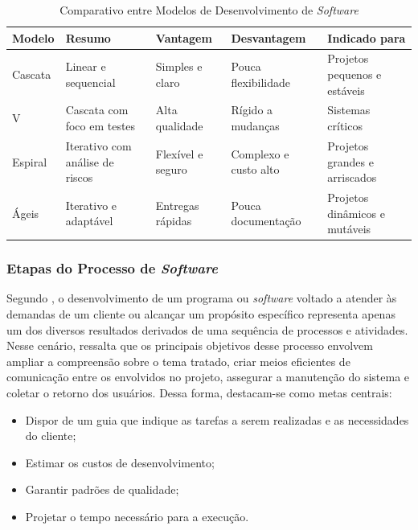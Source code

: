 \documentclass[english,brazilian]{UNISINOSartigo} %
\begin{document}
\begin{table}[ht]
    \caption{Comparativo entre Modelos de Desenvolvimento de \textit{Software}}
    \label{tab:modelosDev}
    \centering%
    \footnotesize
    \begin{tabularx}{\textwidth}{lXXXX}
        \toprule
        \textbf{Modelo} & \textbf{Resumo} & \textbf{Vantagem} & \textbf{Desvantagem} & \textbf{Indicado para}\\
        \midrule
        Cascata & Linear e sequencial & Simples e claro & Pouca flexibilidade & Projetos pequenos e estáveis \\
        \midrule
        V & Cascata com foco em testes & Alta qualidade & Rígido a mudanças & Sistemas críticos \\
        \midrule
        Espiral & Iterativo com análise de riscos & Flexível e seguro & Complexo e custo alto & Projetos grandes e arriscados \\
        \midrule
        Ágeis & Iterativo e adaptável & Entregas rápidas & Pouca documentação & Projetos dinâmicos e mutáveis \\
        \bottomrule
    \end{tabularx}
\end{table}
\FloatBarrier

\subsubsection{Etapas do Processo de \textit{Software}}

Segundo , o desenvolvimento de um programa ou \textit{software} voltado a atender às demandas de um cliente ou alcançar um propósito específico representa apenas um dos diversos resultados derivados de uma sequência de processos e atividades. Nesse cenário,  ressalta que os principais objetivos desse processo envolvem ampliar a compreensão sobre o tema tratado, criar meios eficientes de comunicação entre os envolvidos no projeto, assegurar a manutenção do sistema e coletar o retorno dos usuários. Dessa forma, destacam-se como metas centrais:

\begin{itemize}[leftmargin=1cm, itemsep=0.1em, topsep=0.1em]
    \item Dispor de um guia que indique as tarefas a serem realizadas e as necessidades do cliente;
    \item Estimar os custos de desenvolvimento;
    \item Garantir padrões de qualidade;
    \item Projetar o tempo necessário para a execução.
\end{itemize}
\end{document}
